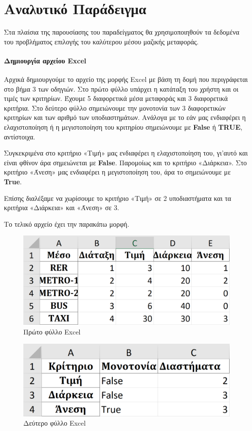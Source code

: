 \documentclass[11pt,a4paper,titlepage]{article}
\numberwithin{equation}{section}
\begin{document}
\section{Αναλυτικό Παράδειγμα}
\label{sec:example}

Στα πλαίσια της παρουσίασης του παραδείγματος θα χρησιμοποιηθούν τα δεδομένα του προβλήματος επιλογής του καλύτερου μέσου μαζικής μεταφοράς.

\paragraph{Δημιουργία αρχείου Excel}
Αρχικά δημιουργούμε το αρχείο της μορφής Excel με βάση τη δομή που περιγράφεται στο βήμα 3 των οδηγιών. Στο πρώτο φύλλο υπάρχει η κατάταξη του χρήστη και οι τιμές των κριτηρίων. Έχουμε 5 διαφορετικά μέσα μεταφοράς και 3 διαφορετικά κριτήρια. Στο δεύτερο φύλλο σημειώνουμε την μονοτονία των 3 διαφορετικών κριτηρίων και των αριθμό των υποδιαστημάτων. Ανάλογα με το εάν μας ενδιαφέρει η ελαχιστοποίηση ή η μεγιστοποίηση του κριτηρίου σημειώνουμε με \textbf{False} ή \textbf{TRUE}, αντίστοιχα.

Συγκεκριμένα στο κριτήριο «Τιμή» μας ενδιαφέρει η ελαχιστοποίηση του, γι'αυτό και είναι φθίνον άρα σημειώνεται με \textbf{False}. Παρομοίως και το κριτήριο «Διάρκεια». Στο κριτήριο «Άνεση» μας ενδιαφέρει η μεγιστοποίηση του, άρα το σημειώνουμε με \textbf{True}. 

Επίσης διαλέξαμε να χωρίσουμε το κριτήριο «Τιμή» σε 2 υποδιαστήματα και τα κριτήρια «Διάρκεια» και «Άνεση» σε 3.

Το τελικό αρχείο έχει την παρακάτω μορφή.

\begin{figure}[H]
	\centering
	\includegraphics[width=0.7\linewidth]{media/excel_sheet_1.png}
	\caption{Πρώτο φύλλο Excel}
	\label{fig:excel_sheet_1}
\end{figure}

\begin{figure}[H]
	\centering
	\includegraphics[width=0.7\linewidth]{media/excel_sheet_2.png}
	\caption{Δεύτερο φύλλο Excel}
	\label{fig:excel_sheet_2}
\end{figure}
\end{document}
